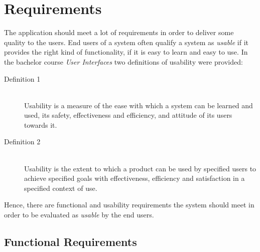 \chapter{Requirements}\label{ch:requirements}

The application should meet a lot of requirements in order to deliver some quality to the users. End users of a system often qualify a system as \textit{usable} if it provides the right kind of functionality, if it is easy to learn and easy to use.
In the bachelor course \textit{User Interfaces} two definitions of usability were provided:
\begin{description}
	\item[Definition 1] \hfill \\
	Usability is a measure of the ease with which a system can be learned and used, its safety, effectiveness and efficiency, and attitude of its users towards it. \hfill \citep{usability-definition-preece}

	\item[Definition 2] \hfill \\
	Usability is the extent to which a product can be used by specified users to achieve specified goals with effectiveness, efficiency and satisfaction in a specified context of use. \hfill \citep{usability-definition-improved}
\end{description}

Hence, there are functional and usability requirements the system should meet in order to be evaluated as \textit{usable} by the end users.

\section{Functional Requirements}\label{sec:functional-requirements}


